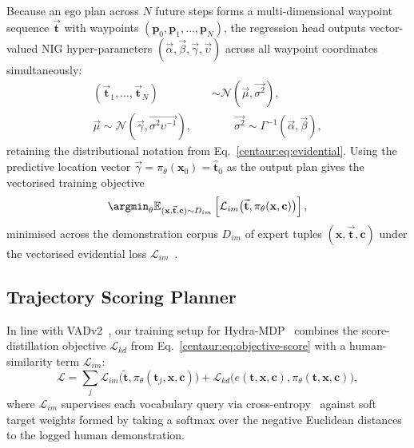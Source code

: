 Because an ego plan across $N$ future steps forms a multi-dimensional waypoint sequence $\vec{\mathbf{t}}$ with waypoints $(\mathbf{p}_0, \mathbf{p}_1, \dots, \mathbf{p}_N)$, the regression head outputs vector-valued NIG hyper-parameters $(\vec{\alpha}, \vec{\beta}, \vec{\gamma}, \vec{\upsilon})$ across all waypoint coordinates simultaneously:
\begin{align}
  (\vec{\mathbf{t}}_1, \dots, \vec{\mathbf{t}}_N) &\sim \mathcal{N}(\vec{\mu}, \vec{\sigma^2}), \nonumber \\
  \vec{\mu} \sim \mathcal{N}(\vec{\gamma}, \vec{\sigma^2 \upsilon^{-1}}), \quad & \qquad \vec{\sigma^2} \sim \Gamma^{-1}(\vec{\alpha}, \vec{\beta}),
  \label{centaur:eq:evidential-vector}
\end{align}
retaining the distributional notation from Eq.~\eqref{centaur:eq:evidential}. Using the predictive location vector $\vec{\gamma} = \pi_\theta(\mathbf{x}_0) = \hat{\mathbf{t}}_0$ as the output plan gives the vectorised training objective
\begin{equation}
  \label{centaur:eq:objective-imi-kd}
  \argmin_{\theta} \mathbb{E}_{(\mathbf{x},\vec{\mathbf{t}},\mathbf{c})\sim D_{im}} \left[\mathcal{L}_{im}\big(\vec{\mathbf{t}}, \pi_\theta(\mathbf{x},\mathbf{c})\big)\right],
\end{equation}
minimised across the demonstration corpus $D_{im}$ of expert tuples $(\mathbf{x},\vec{\mathbf{t}},\mathbf{c})$ under the vectorised evidential loss $\mathcal{L}_{im}$~\cite{amini2020deepevidential}.

\subsection{Trajectory Scoring Planner}\label{centaur:app:scoring}

In line with VADv2~\cite{chen2024vadv2}, our training setup for Hydra-MDP~\cite{li2024hydramdp} combines the score-distillation objective $\mathcal{L}_{kd}$ from Eq.~\eqref{centaur:eq:objective-score} with a human-similarity term $\mathcal{L}_{im}$:
\begin{equation}
  \label{centaur:eq:multi-score}
  \mathcal{L} = \sum_j \mathcal{L}_{im}\big(\tilde{\mathbf{t}}, \pi_\theta(\mathbf{t}_j,\mathbf{x},\mathbf{c})\big) + \mathcal{L}_{kd}\big(e(\mathbf{t},\mathbf{x},\mathbf{c}), \pi_\theta(\mathbf{t},\mathbf{x},\mathbf{c})\big),
\end{equation}
where $\mathcal{L}_{im}$ supervises each vocabulary query via cross-entropy~\cite{li2024hydramdp} against soft target weights formed by taking a softmax over the negative Euclidean distances to the logged human demonstration.

